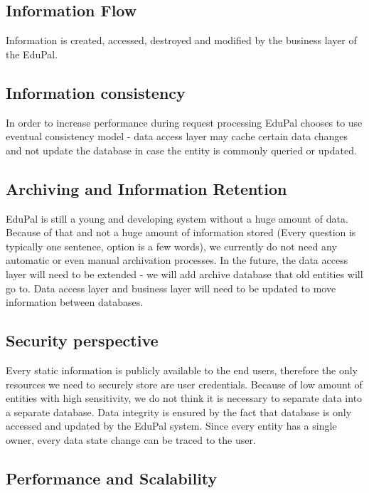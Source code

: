 \subsection{Information Flow}

Information is created, accessed, destroyed and modified by the business layer of the EduPal.

\subsection{Information consistency}

In order to increase performance during request processing EduPal chooses to use eventual consistency model - data access layer may cache certain data changes and not update the database in case the entity is commonly queried or updated.

\subsection{Archiving and Information Retention}

EduPal is still a young and developing system without a huge amount of data. Because of that and not a huge amount of information stored (Every question is typically one sentence, option is a few words), we currently do not need any automatic or even manual archivation processes. In the future, the data access layer will need to be extended - we will add archive database that old entities will go to. Data access layer and business layer will need to be updated to move information between databases.

\subsection{Security perspective}

Every static information is publicly available to the end users, therefore the only resources we need to securely store are user credentials. Because of low amount of entities with high sensitivity, we do not think it is necessary to separate data into a separate database. Data integrity is ensured by the fact that database is only accessed and updated by the EduPal system. Since every entity has a single owner, every data state change can be traced to the user.

\subsection{Performance and Scalability}

